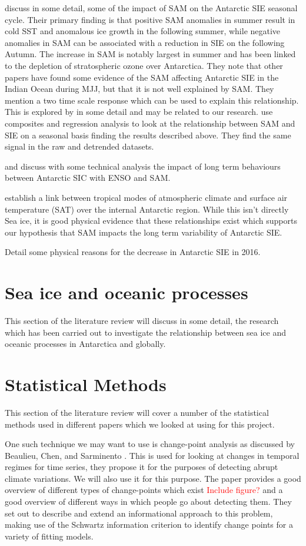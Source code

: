 \documentclass[../main.tex]{subfiles}
\begin{document}
\cite{Doddridge2017} discuss in some detail, some of the impact of SAM on the Antarctic SIE seasonal cycle. Their primary finding is that positive SAM anomalies in summer result in cold SST and anomalous ice growth in the following summer, while negative anomalies in SAM can be associated with a reduction in SIE on the following Autumn. The increase in SAM is notably largest in summer and has been linked to the depletion of stratospheric ozone over Antarctica. They note that other papers have found some evidence of the SAM affecting Antarctic SIE in the Indian Ocean during MJJ, but that it is not well explained by SAM. They mention a two time scale response which can be used to explain this relationship. This is explored by \cite{Ferreira} in some detail and may be related to our research. \cite{Doddridge2017} use composites and regression analysis to look at the relationship between SAM and SIE on a seasonal basis finding the results described above. They find the same signal in the raw and detrended datasets.


\cite{Simpkins2012} and \cite{Kohyama2016} discuss with some technical analysis the impact of long term behaviours between Antarctic SIC with ENSO and SAM.



\cite{Clem2020} establish a link between tropical modes of atmospheric climate and surface air temperature (SAT) over the internal Antarctic region. While this isn't directly Sea ice, it is good physical evidence that these relationships exist which supports our hypothesis that SAM impacts the long term variability of Antarctic SIE.

\cite{Turner2020a} Detail some physical reasons for the decrease in Antarctic SIE in 2016.


\section{Sea ice and oceanic processes}
This section of the literature review will discuss in some detail, the research which has been carried out to investigate the relationship between sea ice and oceanic processes in Antarctica and globally.

\section{Statistical Methods}
This section of the literature review will cover a number of the statistical methods used in different papers which we looked at using for this project. 
\medskip

One such technique we may want to use is change-point analysis as discussed by Beaulieu, Chen, and Sarminento \cite{Beaulieu2012}.
This is used for looking at changes in temporal regimes for time series, they propose it for the purposes of detecting abrupt climate variations. We will also use it for this purpose. The paper provides a good overview of different types of change-points which exist  \textcolor{red}{Include figure?} and a good overview of different ways in which people go about detecting them. They set out to describe and extend an informational approach to this problem, making use of the Schwartz information criterion to identify change points for a variety of fitting models.
\end{document}
